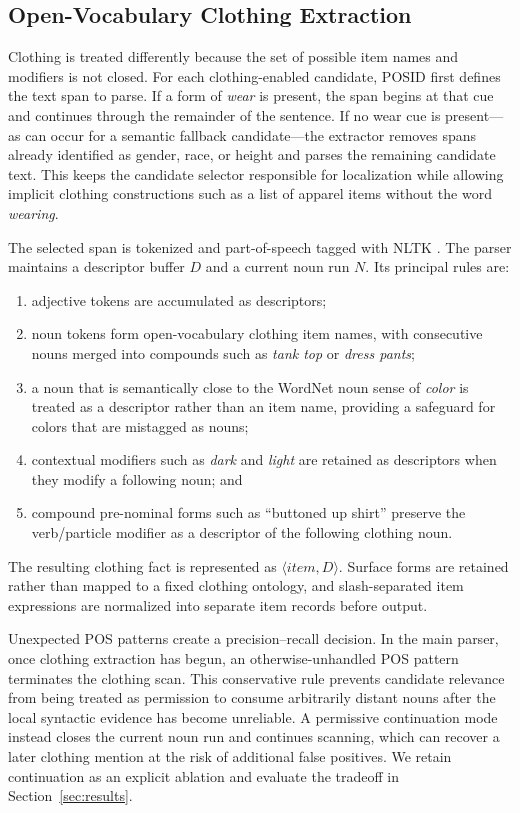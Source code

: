 \documentclass[sigconf,nonacm]{acmart}
\newcommand{\posid}{\textsc{POSID}}
\begin{document}
\subsection{Open-Vocabulary Clothing Extraction}
\label{subsec:clothing-extraction}

Clothing is treated differently because the set of possible item names and
modifiers is not closed.  For each clothing-enabled candidate, \posid{} first
defines the text span to parse.  If a form of \emph{wear} is present, the span
begins at that cue and continues through the remainder of the sentence.  If no
wear cue is present---as can occur for a semantic fallback candidate---the
extractor removes spans already identified as gender, race, or height and parses
the remaining candidate text.  This keeps the candidate selector responsible
for localization while allowing implicit clothing constructions such as a list
of apparel items without the word \emph{wearing}.

The selected span is tokenized and part-of-speech tagged with NLTK
\cite{nltk2002}.  The parser maintains a descriptor buffer $D$ and a current
noun run $N$.  Its principal rules are:
\begin{enumerate}[leftmargin=*,itemsep=2pt,topsep=3pt]
    \item adjective tokens are accumulated as descriptors;
    \item noun tokens form open-vocabulary clothing item names, with consecutive
    nouns merged into compounds such as \emph{tank top} or \emph{dress pants};
    \item a noun that is semantically close to the WordNet noun sense of
    \emph{color} is treated as a descriptor rather than an item name, providing
    a safeguard for colors that are mistagged as nouns;
    \item contextual modifiers such as \emph{dark} and \emph{light} are retained
    as descriptors when they modify a following noun; and
    \item compound pre-nominal forms such as ``buttoned up shirt'' preserve the
    verb/particle modifier as a descriptor of the following clothing noun.
\end{enumerate}
The resulting clothing fact is represented as
$\langle\textit{item},D\rangle$.  Surface forms are retained rather than mapped
to a fixed clothing ontology, and slash-separated item expressions are
normalized into separate item records before output.

Unexpected POS patterns create a precision--recall decision.  In the main
parser, once clothing extraction has begun, an otherwise-unhandled POS pattern
terminates the clothing scan.  This conservative rule prevents candidate
relevance from being treated as permission to consume arbitrarily distant
nouns after the local syntactic evidence has become unreliable.  A permissive
continuation mode instead closes the current noun run and continues scanning,
which can recover a later clothing mention at the risk of additional false
positives.  We retain continuation as an explicit ablation and evaluate the
tradeoff in Section~\ref{sec:results}.
\end{document}

